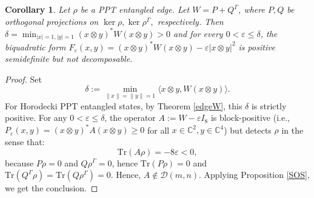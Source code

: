 \documentclass[12pt,a4paper]{amsart}
\theoremstyle{plain}
\newtheorem{corollary}[theorem]{Corollary}
\theoremstyle{remark}
\theoremstyle{definition}
\def \C {\mathbb{C}}
\begin{document}
\begin{corollary}\label{EdgePPTEnt}
Let $\rho$ be a PPT entangled edge. Let $W=P+Q^{\Gamma}$, where $P,Q$ be orthogonal projections on $\ker \rho, \ker \rho^{\Gamma},$ respectively.
Then $\delta = \min_{\vert x\vert =1, \vert y \vert =1 } (x\otimes y)^* W (x\otimes y) >0$ and for every $0<\varepsilon\le \delta$, the biquadratic form $F_{\varepsilon}(x,y)= (x\otimes y)^* W (x\otimes y)- \varepsilon \vert x\otimes y \vert^2$ is positive semidefinite  but not decomposable. 
\end{corollary} 
\begin{proof} Set
\[
\delta := \min_{\|x\|=\|y\|=1} \langle x \otimes y, W(x \otimes y) \rangle.
\]
For Horodecki PPT entangled states, by Theorem \ref{edgeW}, this $\delta$ is strictly positive. For any $0 < \varepsilon \le \delta$, the operator $A := W - \varepsilon I_8$ is block-positive (i.e., $P_{\varepsilon} (x,y)= (x\otimes y)^* A (x\otimes y) \ge 0$ for all $x\in \C^2,y\in \C^4$) but detects $\rho$ in the sense that:
\[
\mathrm{Tr}(A\rho) = -8 \varepsilon < 0,
\]
because $P\rho = 0$ and $Q\rho^\Gamma = 0$, hence $\mathrm{Tr}(P\rho) = 0$ and $\mathrm{Tr}(Q^{\Gamma}\rho) = \mathrm{Tr}(Q\rho^\Gamma) = 0.$ Hence, $A \notin \mathcal{D}(m,n).$ Applying Proposition \ref{SOS},  we get the conclusion.
\end{proof}
\end{document}
